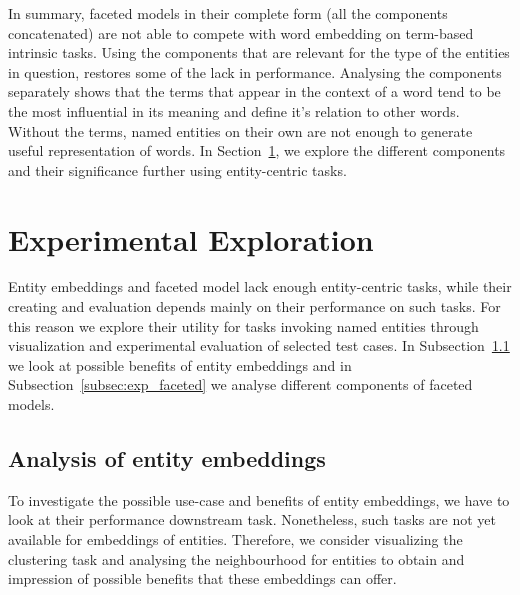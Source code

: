 In summary, faceted models in their complete form (all the components concatenated) are not able to compete with word embedding on term-based intrinsic tasks. Using the components that are relevant for the type of the entities in question, restores some of the lack in performance. Analysing the components separately shows that the terms that appear in the context of a word tend to be the most influential in its meaning and define it's relation to other words. Without the terms, named entities on their own are not enough to generate useful representation of words.  In Section~\ref{sec:eval_experimental}, we explore the different components and their significance further using entity-centric tasks. 
\section{Experimental Exploration}\label{sec:eval_experimental}
Entity embeddings and faceted model lack enough entity-centric tasks, while their creating and evaluation depends mainly on their performance on such tasks. For this reason we explore their utility for tasks invoking named entities through visualization and experimental evaluation of selected test cases. In Subsection~\ref{subsec:exp_entity} we look at possible benefits of entity embeddings and in Subsection~\ref{subsec:exp_faceted} we analyse different components of faceted models. 
\subsection{Analysis of entity embeddings}\label{subsec:exp_entity}
To investigate the possible use-case and benefits of entity embeddings, we have to look at their performance downstream task. Nonetheless, such tasks are not yet available for embeddings of entities. Therefore, we consider visualizing the clustering task and analysing the neighbourhood for entities to obtain and impression of possible benefits that these embeddings can offer. 
